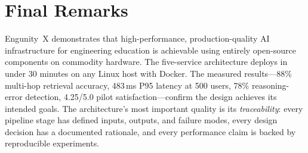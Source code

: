 \section{Final Remarks}
\label{sec:final-remarks}

Engunity~X demonstrates that high-performance, production-quality AI infrastructure for engineering education is achievable using entirely open-source components on commodity hardware. The five-service architecture deploys in under 30 minutes on any Linux host with Docker. The measured results---88\% multi-hop retrieval accuracy, 483\,ms P95 latency at 500 users, 78\% reasoning-error detection, 4.25/5.0 pilot satisfaction---confirm the design achieves its intended goals. The architecture's most important quality is its \textit{traceability}: every pipeline stage has defined inputs, outputs, and failure modes, every design decision has a documented rationale, and every performance claim is backed by reproducible experiments.
